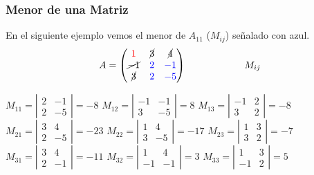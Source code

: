 \documentclass[stu, 12pt, a4paper, donotrepeattitle, floatsintext, natbib]{apa7}
\begin{document}
    \subsubsection{Menor de una Matriz}
    En el siguiente ejemplo vemos el menor de $A_{11}$ ($M_{ij}$) señalado con azul.
    \[A=\begin{pmatrix}
            \color{red}1 & \cancel{3}    & \cancel{4}     \\
            \cancel{-1}  & \color{blue}2 & \color{blue}-1 \\
            \cancel{3}   & \color{blue}2 & \color{blue}-5
    \end{pmatrix}    \qquad \qquad \qquad    M_{ij}\]

    $M_{11}=\left| \begin{matrix}
                       2 & -1 \\ 2 & -5
    \end{matrix} \right| = -8$
    \qquad
    $M_{12}=\left| \begin{matrix}
                       -1 & -1 \\ 3 & -5
    \end{matrix} \right| = 8$
    \qquad
    $M_{13}=\left| \begin{matrix}
                       -1 & 2 \\ 3 & 2
    \end{matrix} \right| = -8$ \\[0.4cm]


    $M_{21}=\left| \begin{matrix}
                       3 & 4 \\ 2 & -5
    \end{matrix} \right| = -23$
    \qquad
    $M_{22}=\left| \begin{matrix}
                       1 & 4 \\ 3 & -5
    \end{matrix} \right| = -17$
    \qquad
    $M_{23}=\left| \begin{matrix}
                       1 & 3 \\ 3 & 2
    \end{matrix} \right| = -7$\\[0.4cm]


    $M_{31}=\left| \begin{matrix}
                       3 & 4 \\ 2 & -1
    \end{matrix} \right| = -11$
    \qquad
    $M_{32}=\left| \begin{matrix}
                       1 & 4 \\ -1 & -1
    \end{matrix} \right| = 3$
    \qquad
    $M_{33}=\left| \begin{matrix}
                       1 & 3 \\ -1 & 2
    \end{matrix} \right| = 5$ \\
\end{document}
